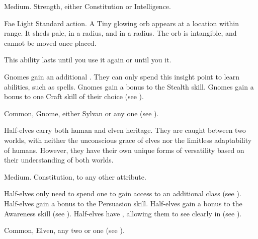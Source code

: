    Medium.
    Strength, either  Constitution or  Intelligence.
  \begin{raggeditemize}
    \begin{activeability}{Fae Light}
      \abilityusagetime Standard action.
      \rankline
      A Tiny glowing orb appears at a location within \rngmed range.
      It sheds pale,  in a \areasmall radius, and  in a \areamed radius.
      The orb is intangible, and cannot be moved once placed.

      This ability lasts until you use it again or until you  it.
    \end{activeability}
     Gnomes gain an additional .
      They can only spend this insight point to learn \magical abilities, such as spells.
     Gnomes gain a  bonus to the Stealth skill.
     Gnomes gain a  bonus to one Craft skill of their choice (see ).
  \end{raggeditemize}
   Common, Gnome, either Sylvan or any one  (see ).


  Half-elves carry both human and elven heritage.
  They are caught between two worlds, with neither the unconscious grace of elves nor the limitless adaptability of humans.
  However, they have their own unique forms of versatility based on their understanding of both worlds.

   Medium.
    Constitution,  to any other attribute.
  \begin{raggeditemize}
     Half-elves only need to spend one  to gain access to an additional class (see ).
     Half-elves gain a  bonus to the Persuasion skill.
     Half-elves gain a  bonus to the Awareness skill (see ).
     Half-elves have , allowing them to see clearly in  (see ).
  \end{raggeditemize}
   Common, Elven, any two  or one  (see ).

